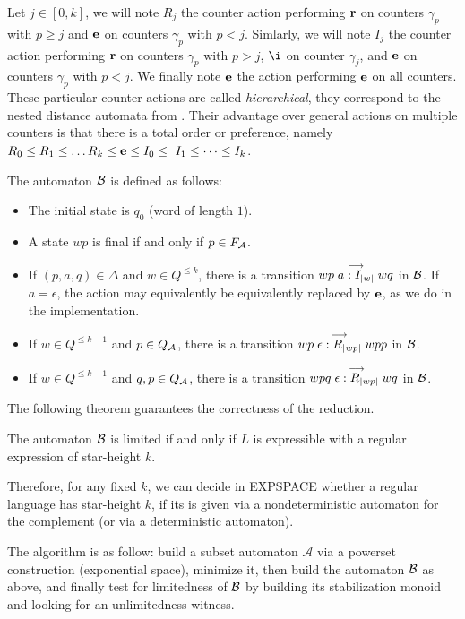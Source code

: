 Let $j\in[0,k]$, we will note $R_j$ the counter action performing $\mathbf{r}$ on counters $\gamma_p$ with $p\geq j$ and $\mathbf{e}$ on counters $\gamma_p$ with $p<j$. Simlarly, we will note $I_j$ the counter action performing $\mathbf{r}$ on counters $\gamma_p$ with $p> j$, $\i$ on counter $\gamma_j$, and $\mathbf{e}$ on counters $\gamma_p$ with $p<j$. We finally note $\mathbf{e}$ the action performing $\mathbf{e}$ on all counters.
These particular counter actions are called \emph{hierarchical}, they correspond to the nested distance automata from \cite{Kirsten05}. Their advantage over general actions on multiple counters is that there is a total order or preference, namely $R_0\leq R_1\leq\dots R_k\leq \e\leq I_0\leq\ I_1\leq\dots\leq I_k$. 

The automaton $\mathcal B$ is defined as follows:

\begin{itemize}
\item The initial state is $q_0$ (word of length $1$).
\item A state $wp$ is final if and only if $p\in F_{\mathcal{A}}$.
\item If $(p,a,q)\in\Delta$ and $w\in Q^{\leq k}$, there is a transition $wp\stackrel{\longrightarrow}{a:I_{|w|}}wq$ in $\mathcal B$. If $a=\epsilon$, the action may equivalently be equivalently replaced by $\mathbf{e}$, as we do in the implementation.
\item If $w\in Q^{\leq k-1}$ and $p\in Q_{\mathcal{A}}$, there is a transition $wp\stackrel{\longrightarrow}{\epsilon:R_{|wp|}}wpp$ in $\mathcal B$.
\item If $w\in Q^{\leq k-1}$ and $q,p\in Q_{\mathcal{A}}$, there is a transition $wpq\stackrel{\longrightarrow}{\epsilon:R_{|wp|}}wq$ in $\mathcal B$.
\end{itemize}


The following theorem guarantees the correctness of the reduction.
\begin{theorem}\cite{CL08sh}
The automaton $\mathcal B$ is limited if and only if $L$ is expressible with a regular expression of star-height $k$.
\end{theorem}

Therefore, for any fixed $k$, we can decide in EXPSPACE whether a regular language has star-height $k$, if its is given via a nondeterministic automaton for the complement (or via a deterministic automaton).

The algorithm is as follow: build a subset automaton $\mathcal A$ via a powerset construction (exponential space), minimize it, then build the automaton $\mathcal B$ as above, and finally test for limitedness of $\mathcal B$ by building its stabilization monoid and looking for an unlimitedness witness.
